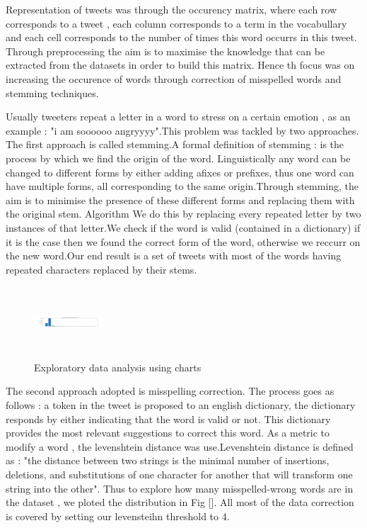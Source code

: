 \documentclass[10pt,conference,compsocconf]{IEEEtran}
\begin{document}
Representation of tweets was through the occurency matrix, where each row corresponds to a tweet , each column corresponds to a term in the vocabullary and each cell corresponds to the number of times this word occurrs in this tweet. Through preprocessing the aim is to maximise the knowledge that can be extracted from the datasets in order to build this matrix.  Hence th focus was on increasing the occurence of words through correction of misspelled words and stemming techniques.

Usually tweeters repeat a letter in a word to stress on a certain emotion , as an example : "i am soooooo angryyyy".This problem was tackled by two approaches.
The first approach is called stemming.A formal definition of stemming : is the process by which we find the origin of the word. Linguistically any word can be changed to different forms by either adding afixes or prefixes, thus one word can have multiple forms, all corresponding to the same origin.Through stemming, the aim is to minimise the presence of these different forms and replacing them with the original stem. Algorithm
We do this by replacing every repeated letter by two instances of that letter.We check if the word is valid (contained in a dictionary) if it is the case then we found the correct form of the word, otherwise we reccurr on the new word.Our end result is a set of tweets with most of the words having repeated characters replaced by their stems.

\begin{figure}[!htb]
	\centering \includegraphics[height=100px,width=100px]{../plots/distributionA.png}
	\caption{Exploratory data analysis using charts}
	\label{fig:data}
\end{figure}

The second approach adopted is misspelling correction. The process goes as follows : a token in the tweet is proposed to an english dictionary, the dictionary responds by either indicating that the word is valid or not. This dictionary provides the most relevant suggestions to correct this word. As a metric to modify a word , the levenshtein distance was use.Levenshtein distance is defined as : "the distance between two strings is the minimal number of insertions, deletions, and substitutions of one character for another that will transform one string into the other". Thus to explore how many misspelled-wrong words are in the dataset , we ploted the distribution in Fig []. All most of the data correction is covered by setting our levensteihn threshold to 4.
\end{document}
